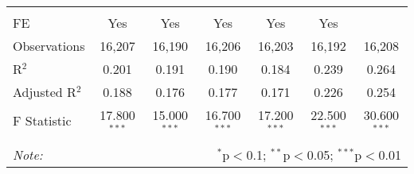 \begin{table}[!htbp]
\begin{tabular}{@{\extracolsep{5pt}}lcccccc}
\hline \\[-1.8ex] 
FE & Yes & Yes & Yes & Yes & Yes &  \\ 
Observations & 16,207 & 16,190 & 16,206 & 16,203 & 16,192 & 16,208 \\ 
R$^{2}$ & 0.201 & 0.191 & 0.190 & 0.184 & 0.239 & 0.264 \\ 
Adjusted R$^{2}$ & 0.188 & 0.176 & 0.177 & 0.171 & 0.226 & 0.254 \\ 
F Statistic & 17.800$^{***}$ & 15.000$^{***}$ & 16.700$^{***}$ & 17.200$^{***}$ & 22.500$^{***}$ & 30.600$^{***}$ \\ 
\hline 
\hline \\[-1.8ex] 
\textit{Note:}  & \multicolumn{6}{r}{$^{*}$p$<$0.1; $^{**}$p$<$0.05; $^{***}$p$<$0.01} \\ 
\end{tabular} 
\end{table} 
